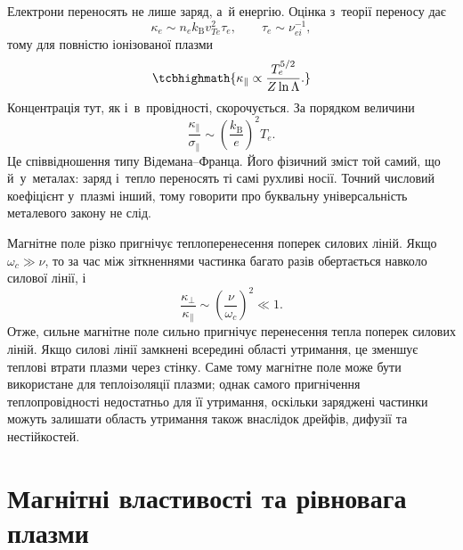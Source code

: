 Електрони переносять не лише заряд, а~й енергію. Оцінка з~теорії переносу дає
\begin{equation*}
	\kappa_e\sim n_ek_{\mathrm B}v_{Te}^2\tau_e,
	\qquad \tau_e\sim\nu_{ei}^{-1},
\end{equation*}
тому для повністю іонізованої плазми
\begin{equation}\label{eq:kappa-plasma}
	\tcbhighmath{\kappa_\parallel\propto\frac{T_e^{5/2}}{Z\ln\Lambda}.}
\end{equation}
Концентрація тут, як і~в~провідності, скорочується. За порядком величини
\begin{equation*}
	\frac{\kappa_\parallel}{\sigma_\parallel}\sim
	\left(\frac{k_{\mathrm B}}e\right)^2T_e.
\end{equation*}
Це співвідношення типу Відемана--Франца. Його фізичний зміст той самий, що й~у~металах:
заряд і~тепло переносять ті самі рухливі носії. Точний числовий коефіцієнт у~плазмі інший,
тому говорити про буквальну універсальність металевого закону не слід.

Магнітне поле різко пригнічує теплоперенесення поперек силових ліній. Якщо
$\omega_c\gg\nu$, то за час між зіткненнями частинка багато разів обертається навколо
силової лінії, і~
\begin{equation}\label{eq:kappa-perp}
	\frac{\kappa_\perp}{\kappa_\parallel}\sim
	\left(\frac{\nu}{\omega_c}\right)^2\ll1.
\end{equation}
Отже, сильне магнітне поле сильно пригнічує перенесення тепла
поперек силових ліній. Якщо силові лінії замкнені всередині області
утримання, це зменшує теплові втрати плазми через стінку. Саме тому
магнітне поле може бути використане для теплоізоляції плазми; однак
самого пригнічення теплопровідності недостатньо для її утримання,
оскільки заряджені частинки можуть залишати область утримання також
внаслідок дрейфів, дифузії та нестійкостей.

\section{Магнітні властивості та рівновага плазми}\label{sec:magnetic-confinement}\hypertarget{magnetic-confinement}{}



